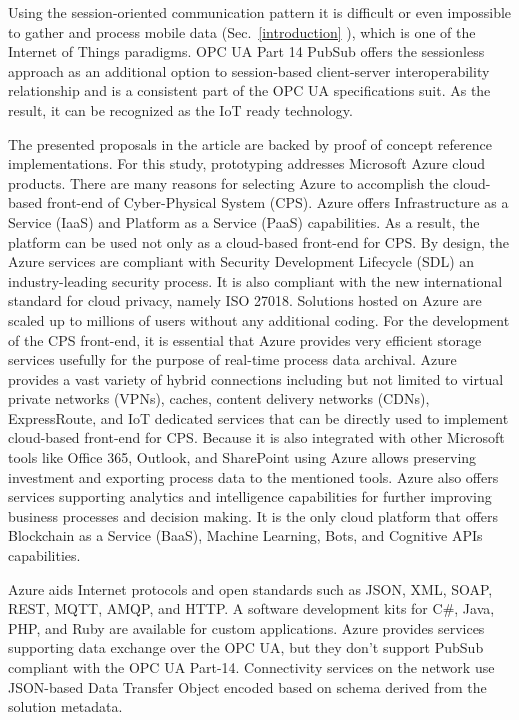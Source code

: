 \documentclass[runningheads]{llncs}
\begin{document}
Using the session-oriented communication pattern it is difficult or even impossible to gather and process mobile data (Sec.~\ref{introduction} ), which is one of the Internet of Things paradigms. OPC UA Part 14 PubSub \cite{RefWorks:doc:5d98837de4b055984c0eecf0, UAPart14PubSubMainTechnologyFeatures} offers the sessionless approach as an additional option to session-based client-server interoperability relationship and is a consistent part of the OPC UA specifications suit. As the result, it can be recognized as the IoT ready technology.

The presented proposals in the article are backed by proof of concept reference implementations\cite{mariusz_postol_2020_4361640}. For this study, prototyping addresses Microsoft Azure cloud products. There are many reasons for selecting Azure to accomplish the cloud-based front-end of Cyber-Physical System (CPS). Azure offers Infrastructure as a Service (IaaS) and Platform as a Service (PaaS) capabilities. As a result, the platform can be used not only as a cloud-based front-end for CPS. By design, the Azure services are compliant with Security Development Lifecycle (SDL) an industry-leading security process. It is also compliant with the new international standard for cloud privacy, namely ISO 27018. Solutions hosted on Azure are scaled up to millions of users without any additional coding. For the development of the CPS front-end, it is essential that Azure provides very efficient storage services usefully for the purpose of real-time process data archival. Azure provides a vast variety of hybrid connections including but not limited to virtual private networks (VPNs), caches, content delivery networks (CDNs), ExpressRoute, and IoT dedicated services that can be directly used to implement cloud-based front-end for CPS. Because it is also integrated with other Microsoft tools like Office 365, Outlook, and SharePoint using Azure allows preserving investment and exporting process data to the mentioned tools. Azure also offers services supporting analytics and intelligence capabilities for further improving business processes and decision making. It is the only cloud platform that offers Blockchain as a Service (BaaS), Machine Learning, Bots, and Cognitive APIs capabilities.

Azure aids Internet protocols and open standards such as JSON, XML, SOAP, REST, MQTT, AMQP, and HTTP. A software development kits for C\#, Java, PHP, and Ruby are available for custom applications. Azure provides services supporting data exchange over the OPC UA, but they don't support PubSub compliant with the OPC UA Part-14. Connectivity services on the network use JSON-based Data Transfer Object encoded based on schema derived from the solution metadata.
\end{document}
